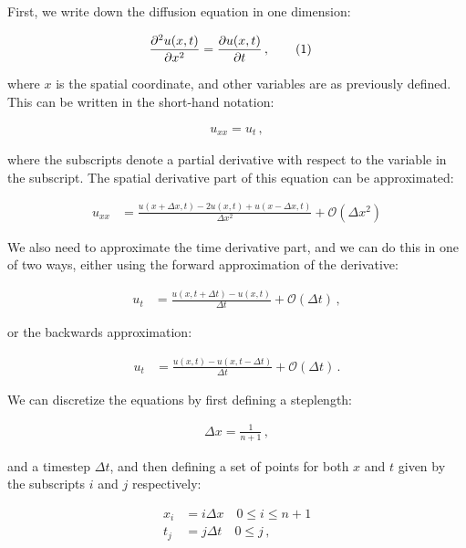 \documentclass[reprint,english,notitlepage]{revtex4-1}  %
\newcommand\numberthis{\addtocounter{equation}{1}\tag{\theequation}}
\begin{document}
First, we write down the diffusion equation in one dimension:

\begin{align*}
\frac{\partial^2 u(x,t)}{\partial x ^2} &= \frac{\partial u(x,t)}{\partial t} \, , \numberthis \label{eq:1D_diff_eq}
\end{align*}

where $x$ is the spatial coordinate, and other variables are as previously defined. This can be written in the short-hand notation:

\begin{align*}
u_{xx} = u_t \, ,
\end{align*}

where the subscripts denote a partial derivative with respect to the variable in the subscript. The spatial derivative part of this equation can be approximated:

\begin{align*}
u_{xx} &= \frac{u(x + \Delta x,t) - 2u(x,t) + u(x-\Delta x,t)}{\Delta x^2} + \mathcal{O}(\Delta x^2)
\end{align*}

We also need to approximate the time derivative part, and we can do this in one of two ways, either using the forward approximation of the derivative:

\begin{align*}
u_t &= \frac{u(x,t+\Delta t) - u(x,t)}{\Delta t} + \mathcal{O}(\Delta t) \, ,
\end{align*}

or the backwards approximation:

\begin{align*}
u_t &= \frac{u(x,t) - u(x,t-\Delta t)}{\Delta t} + \mathcal{O}(\Delta t) \, .
\end{align*}

We can discretize the equations by first defining a steplength:

\begin{align*}
\Delta x = \frac{1}{n+1} \, ,
\end{align*}

and a timestep $\Delta t$, and then defining a set of points for both $x$ and $t$ given by the subscripts $i$ and $j$ respectively:

\begin{align*}
x_i &= i \Delta x \quad 0 \leq i \leq n+1 \\
t_j &= j \Delta t \quad 0 \leq j \, ,
\end{align*}
\end{document}
